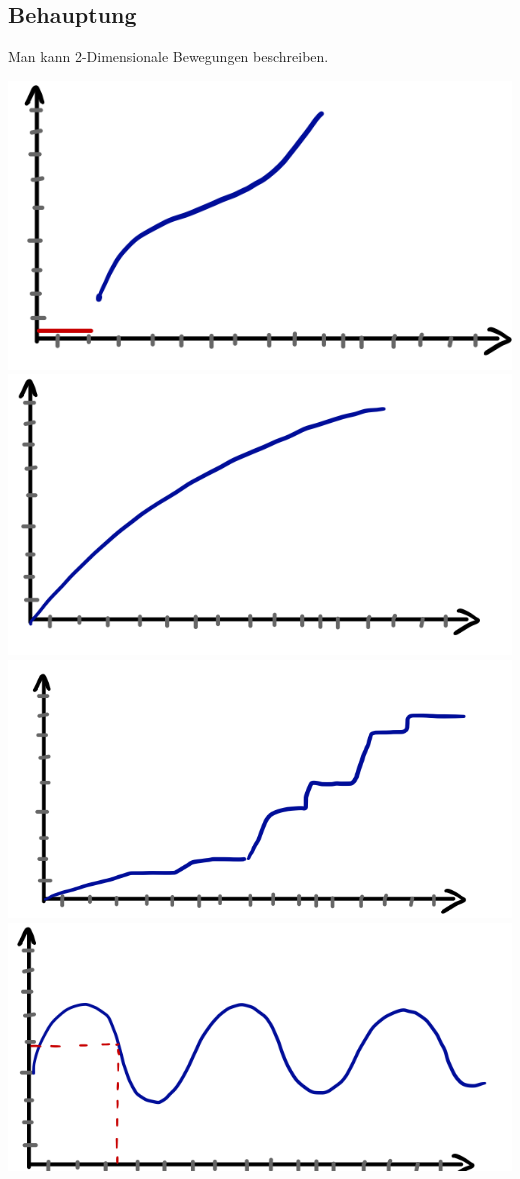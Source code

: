 \documentclass[11pt]{article}
\begin{document}
	\subsection{Behauptung}
	Man kann 2-Dimensionale Bewegungen beschreiben.
	\begin{center}
		\includegraphics[scale=0.3]{20190411_073844099_iOS.png}
		\includegraphics[scale=0.3]{20190411_074045495_iOS.png}
		\includegraphics[scale=0.3]{20190411_074437642_iOS.png}
		\includegraphics[scale=0.3]{20190411_074619898_iOS.png}\\

\end{center}
\end{document}
